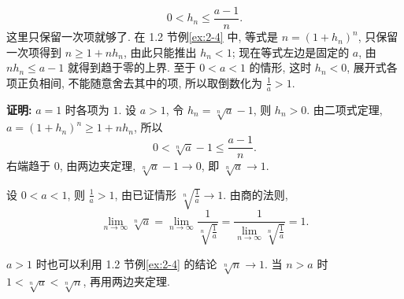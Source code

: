 \documentclass[UTF8,openany]{ctexbook}
\theoremstyle{chinesetextbook}
\newenvironment{cnproof}{\par\indent\textbf{证明:} \ignorespaces}{\par}
\begin{document}
\[
0<h_n\le\frac{a-1}n.
\]
这里只保留一次项就够了. 在 1.2 节例\ref{ex:2-4} 中, 等式是 $n=(1+h_n)^n$, 只保留一次项得到 $n\ge1+nh_n$, 由此只能推出 $h_n<1$; 现在等式左边是固定的 $a$, 由 $nh_n\le a-1$ 就得到趋于零的上界. 至于 $0<a<1$ 的情形, 这时 $h_n<0$, 展开式各项正负相间, 不能随意舍去其中的项, 所以取倒数化为 $\displaystyle\frac1a>1$.
\begin{cnproof}
$a=1$ 时各项为 $1$. 设 $a>1$, 令 $h_n=\sqrt[n]a-1$, 则 $h_n>0$. 由二项式定理, $a=(1+h_n)^n\ge1+nh_n$, 所以
\[
0<\sqrt[n]a-1\le\frac{a-1}n.
\]
右端趋于 $0$, 由两边夹定理, $\sqrt[n]a-1\to0$, 即 $\sqrt[n]a\to1$.

设 $0<a<1$, 则 $\displaystyle\frac1a>1$, 由已证情形 $\displaystyle\sqrt[n]{\frac1a}\to1$. 由商的法则,
\[
\lim_{n\to\infty}\sqrt[n]a=\lim_{n\to\infty}\frac1{\sqrt[n]{\frac1a}}=\frac1{\displaystyle\lim_{n\to\infty}\sqrt[n]{\frac1a}}=1.
\]
\end{cnproof}
$a>1$ 时也可以利用 1.2 节例\ref{ex:2-4} 的结论 $\sqrt[n]n\to1$. 当 $n>a$ 时 $1<\sqrt[n]a<\sqrt[n]n$, 再用两边夹定理.
\end{document}
